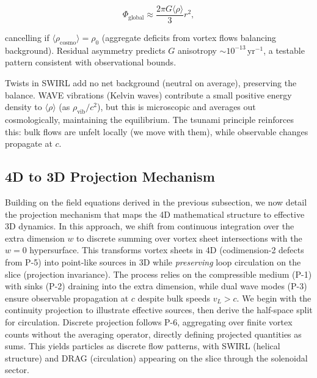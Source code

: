 \begin{equation}
\Phi_{\text{global}} \approx \frac{2\pi G \langle \rho \rangle}{3} r^2,
\end{equation}

cancelling if $\langle \rho_{\text{cosmo}} \rangle = \rho_0$ (aggregate deficits from vortex flows balancing background). Residual asymmetry predicts $G$ anisotropy $\sim 10^{-13} \,\mathrm{yr}^{-1}$, a testable pattern consistent with observational bounds.

Twists in SWIRL add no net background (neutral on average), preserving the balance. WAVE vibrations (Kelvin waves) contribute a small positive energy density to $\langle \rho \rangle$ (as $\rho_{\text{vib}} / c^2$), but this is microscopic and averages out cosmologically, maintaining the equilibrium. The tsunami principle reinforces this: bulk flows are unfelt locally (we move with them), while observable changes propagate at $c$.

\medskip
{}
\medskip

\subsection{4D to 3D Projection Mechanism}

Building on the field equations derived in the previous subsection, we now detail the projection mechanism that maps the 4D mathematical structure to effective 3D dynamics. In this approach, we shift from continuous integration over the extra dimension $w$ to discrete summing over vortex sheet intersections with the $w=0$ hypersurface. This transforms vortex sheets in 4D (codimension-2 defects from P-5) into point-like sources in 3D while \emph{preserving} loop circulation on the slice (projection invariance). The process relies on the compressible medium (P-1) with sinks (P-2) draining into the extra dimension, while dual wave modes (P-3) ensure observable propagation at $c$ despite bulk speeds $v_L > c$. We begin with the continuity projection to illustrate effective sources, then derive the half-space split for circulation. Discrete projection follows P-6, aggregating over finite vortex counts without the averaging operator, directly defining projected quantities as sums. This yields particles as discrete flow patterns, with SWIRL (helical structure) and DRAG (circulation) appearing on the slice through the solenoidal sector.


